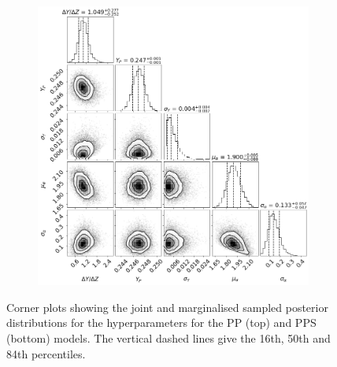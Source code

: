\begin{figure}
    \begin{subfigure}[b]{.66\linewidth}
        \centering
        \includegraphics[width=\textwidth]{figures/corner_plot_pps.png}
    \end{subfigure}
    \caption[Corner plots showing the joint and marginalised sampled posterior distributions for the PP and PPS hyperparameters.]{Corner plots showing the joint and marginalised sampled posterior distributions for the hyperparameters for the PP (top) and PPS (bottom) models. The vertical dashed lines give the 16th, 50th and 84th percentiles.}
    \label{fig:corners-pp}
\end{figure} 

